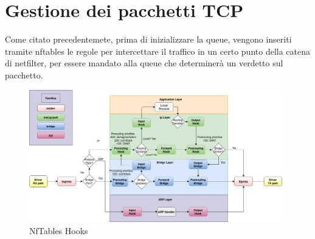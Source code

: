 \section{Gestione dei pacchetti TCP}

Come citato precedentemete, prima di inizializzare la queue, vengono inseriti tramite nftables le regole per intercettare il traffico in un certo punto della catena di netfilter, per essere mandato alla queue che determinerà un verdetto sul pacchetto.\\

\begin{figure}[H]
    \centering
    \includegraphics[width=0.98\textwidth]{images/chapter3/nf-hooks.png}
    \caption{NfTables Hooks}\label{fig:nftables_hooks}
\end{figure}

